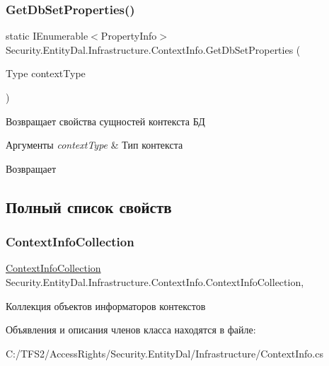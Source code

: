 \subsubsection{\texorpdfstring{Get\+Db\+Set\+Properties()}{GetDbSetProperties()}}
{\footnotesize\ttfamily static I\+Enumerable$<$Property\+Info$>$ Security.\+Entity\+Dal.\+Infrastructure.\+Context\+Info.\+Get\+Db\+Set\+Properties (\begin{DoxyParamCaption}\item[{Type}]{context\+Type }\end{DoxyParamCaption})\hspace{0.3cm}{\ttfamily [static]}}



Возвращает свойства сущностей контекста БД 


\begin{DoxyParams}{Аргументы}
{\em context\+Type} & Тип контекста\\
\hline
\end{DoxyParams}
\begin{DoxyReturn}{Возвращает}

\end{DoxyReturn}


\subsection{Полный список свойств}
\mbox{\label{class_security_1_1_entity_dal_1_1_infrastructure_1_1_context_info_a2299ae5ae18c6ddc3ec978ab87f90a40}} 
\subsubsection{\texorpdfstring{Context\+Info\+Collection}{ContextInfoCollection}}
{\footnotesize\ttfamily \hyperlink{class_security_1_1_entity_dal_1_1_infrastructure_1_1_context_info_collection}{Context\+Info\+Collection} Security.\+Entity\+Dal.\+Infrastructure.\+Context\+Info.\+Context\+Info\+Collection\hspace{0.3cm}{\ttfamily [static]}, {\ttfamily [get]}}



Коллекция объектов информаторов контекстов 



Объявления и описания членов класса находятся в файле\+:\begin{DoxyCompactItemize}
\item 
C\+:/\+T\+F\+S2/\+Access\+Rights/\+Security.\+Entity\+Dal/\+Infrastructure/Context\+Info.\+cs\end{DoxyCompactItemize}
